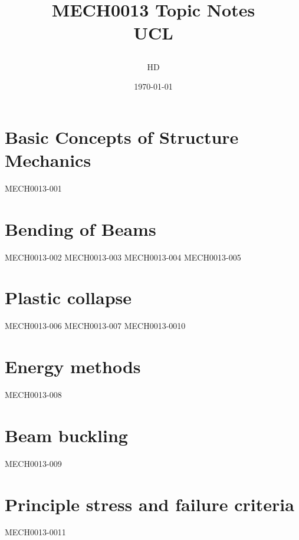 \documentclass[12pt,a4paper, twoside]{report}
\begin{document}
\title{
  {MECH0013 Topic Notes}\\
  {\large UCL}
  \author{HD}
  \date{\today}
}
\maketitle
\tableofcontents
\chapter{Basic Concepts of Structure Mechanics}
{MECH0013-001}
\chapter{Bending of Beams}
{MECH0013-002}
{MECH0013-003}
{MECH0013-004}
{MECH0013-005}
\chapter{Plastic collapse}
{MECH0013-006}
{MECH0013-007}
{MECH0013-0010}
\chapter{Energy methods}
{MECH0013-008}
\chapter{Beam buckling}
{MECH0013-009}
\chapter{Principle stress and failure criteria}
{MECH0013-0011}
\end{document}
